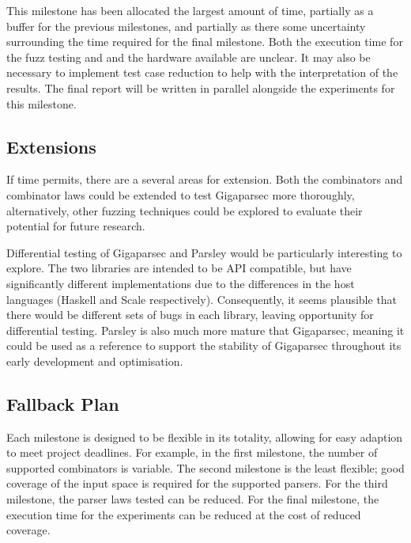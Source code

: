 \documentclass{article}
\begin{document}
This milestone has been allocated the largest amount of time, partially as a buffer for the previous milestones, and partially as there some uncertainty surrounding the time required for the final milestone. Both the execution time for the fuzz testing and and the hardware available are unclear. It may also be necessary to implement test case reduction to help with the interpretation of the results. The final report will be written in parallel alongside the experiments for this milestone.

\subsection{Extensions}

If time permits, there are a several areas for extension. Both the combinators and combinator laws could be extended to test Gigaparsec more thoroughly, alternatively, other fuzzing techniques could be explored to evaluate their potential for future research.

Differential testing of Gigaparsec and Parsley \cite{garnishing} would be particularly interesting to explore. The two libraries are intended to be API compatible, but have significantly different implementations due to the differences in the host languages (Haskell and Scale respectively). Consequently, it seems plausible that there would be different sets of bugs in each library, leaving opportunity for differential testing. Parsley is also much more mature that Gigaparsec, meaning it could be used as a reference to support the stability of Gigaparsec throughout its early development and optimisation.

\subsection{Fallback Plan}
Each milestone is designed to be flexible in its totality, allowing for easy adaption to meet project deadlines. For example, in the first milestone, the number of supported combinators is variable. The second milestone is the least flexible; good coverage of the input space is required for the supported parsers. For the third milestone, the parser laws tested can be reduced. For the final milestone, the execution time for the experiments can be reduced at the cost of reduced coverage.

\raggedright

\end{document}
